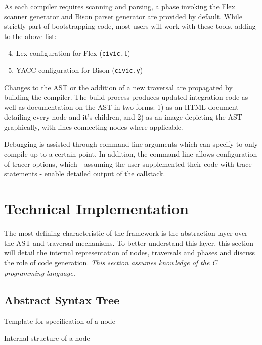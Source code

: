 \documentclass[twoside,openright]{uva-bachelor-thesis}
\newcommand{\code}[1]{\texttt{\footnotesize#1}}
\begin{document}
		As each compiler requires scanning and parsing, a phase invoking the Flex scanner generator and Bison parser generator are provided by default. While strictly part of bootstrapping code, most users will work with these tools, adding to the above list:
		\begin{enumerate}
			\setcounter{enumi}{3}
			\item Lex configuration for Flex (\code{civic.l})
			\item YACC configuration for Bison (\code{civic.y})
		\end{enumerate}
		
		Changes to the AST or the addition of a new traversal are propagated by building the compiler. The build process produces updated integration code as well as documentation on the AST in two forms: 1) as an HTML document detailing every node and it's children, and 2) as an image depicting the AST graphically, with lines connecting nodes where applicable.
		
		Debugging is assisted through command line arguments which can specify to only compile up to a certain point. In addition, the command line allows configuration of tracer options, which - assuming the user supplemented their code with trace statements - enable detailed output of the callstack.
	
		
	\section{Technical Implementation}
		The most defining characteristic of the framework is the abstraction layer over the AST and traversal mechanisms. To better understand this layer, this section will detail the internal representation of nodes, traversals and phases and discuss the role of code generation. \emph{This section assumes knowledge of the C programming language.}
				
		\subsection{Abstract Syntax Tree}
		\label{c-ast}
			\begin{codebox}[label=xml-node-structure]{Template for specification of a node}
			\end{codebox}
			
			\begin{codebox}[label=c-node-structure]{Internal structure of a node}
			\end{codebox}
			
\end{document}

